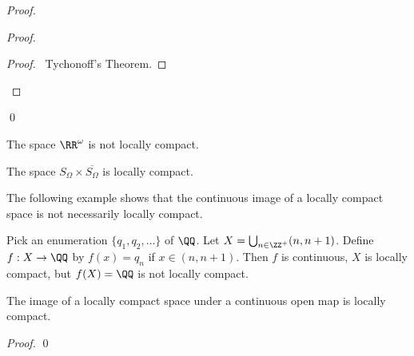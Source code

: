 \begin{proof}
    \begin{proof}
        \begin{proof}
            \pf\ Tychonoff's Theorem.
        \end{proof}
    \end{proof}
    \qed
\end{proof}

\begin{corollary}
    The space $\RR^\omega$ is not locally compact.
\end{corollary}

\begin{example}
    The space $S_\Omega \times \overline{S_\Omega}$ is locally compact.
\end{example}

The following example shows that the continuous image of a locally compact space is not necessarily
locally compact.

\begin{example}
    Pick an enumeration $\{ q_1, q_2, \ldots \}$ of $\QQ$. Let $X = \bigcup_{n \in \ZZ^+} (n, n+1)$.
    Define $f : X \rightarrow \QQ$ by $f(x) = q_n$ if $x \in (n, n+1)$. Then $f$ is continuous,
    $X$ is locally compact, but $f(X) = \QQ$ is not locally compact.
\end{example}

\begin{proposition}
    \label{proposition:continuous_open_image_locally_compact}
    The image of a locally compact space under a continuous open map is locally compact.
\end{proposition}

\begin{proof}
    \pf
    \qed
\end{proof}

